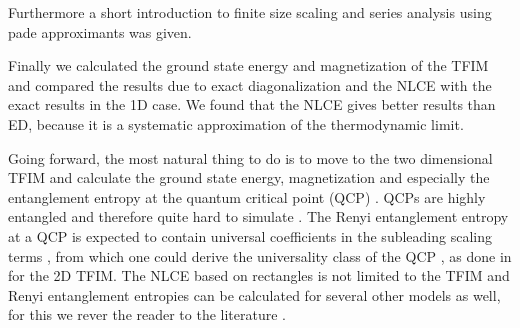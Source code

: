\documentclass{article}
\begin{document}
Furthermore a short introduction to finite size scaling and series
analysis using pade approximants was given.

Finally we calculated the ground state energy and magnetization of the
TFIM and compared the results due to exact diagonalization and the
NLCE with the exact results in the 1D case. We found that the NLCE
gives better results than ED, because it is a systematic approximation
of the thermodynamic limit.

Going forward, the most natural thing to do is to move to the two
dimensional TFIM and calculate the ground state energy, magnetization
and especially the entanglement entropy at the quantum critical point (QCP)
\cite{sachdev}. QCPs are highly entangled and therefore quite hard to
simulate \cite{vidal}. The Renyi entanglement entropy at a QCP is
expected to contain universal coefficients in the subleading scaling
terms \cite{Huerta}, from which one could derive the universality
class of the QCP \cite{Kallin,Melko}, as done in \cite{Kallin} for
the 2D TFIM. The NLCE based on rectangles is not limited to the TFIM and Renyi
entanglement entropies can be calculated for several other models as
well, for this we rever the reader to the literature
\cite{Kallin,Melko,melko1}.\\



\medskip

\printbibliography
\end{document}
